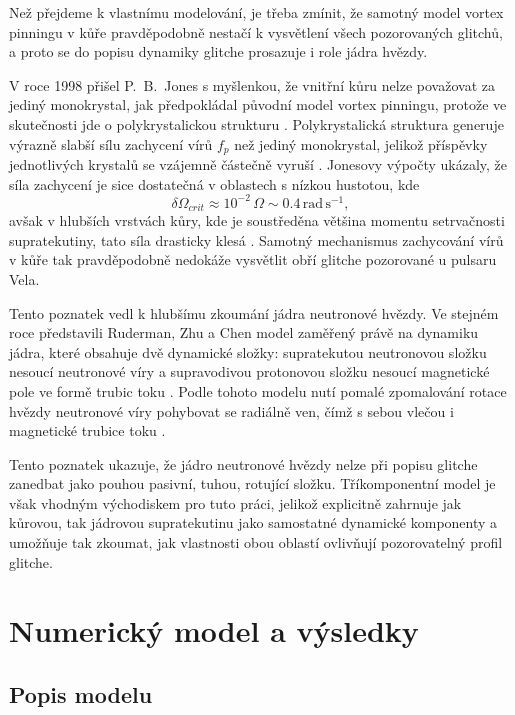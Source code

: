 \documentclass[%
final%
,htext%
]{ipothes}
\begin{document}
Než přejdeme k vlastnímu modelování, je třeba zmínit, že samotný model vortex pinningu v kůře pravděpodobně nestačí k vysvětlení všech pozorovaných glitchů, a proto se do popisu dynamiky glitche prosazuje i role jádra hvězdy.

V roce 1998 přišel P.~B.~Jones s myšlenkou, že vnitřní kůru nelze považovat za jediný monokrystal, jak předpokládal původní model vortex pinningu, protože ve skutečnosti jde o polykrystalickou strukturu \cite{jones1998}. Polykrystalická struktura generuje výrazně slabší sílu zachycení vírů $f_p$ než jediný monokrystal, jelikož příspěvky jednotlivých krystalů se vzájemně částečně vyruší \cite{jones1998}. Jonesovy výpočty ukázaly, že síla zachycení je sice dostatečná v oblastech s nízkou hustotou, kde
\begin{equation}
\delta\Omega_{crit} \approx 10^{-2}\,\Omega \sim 0.4\,\mathrm{rad\,s^{-1}},
\end{equation}
avšak v hlubších vrstvách kůry, kde je soustředěna většina momentu setrvačnosti supratekutiny, tato síla drasticky klesá \cite{jones1998}. Samotný mechanismus zachycování vírů v kůře tak pravděpodobně nedokáže vysvětlit obří glitche pozorované u pulsaru Vela.

Tento poznatek vedl k hlubšímu zkoumání jádra neutronové hvězdy. Ve stejném roce představili Ruderman, Zhu a Chen model zaměřený právě na dynamiku jádra, které obsahuje dvě dynamické složky: supratekutou neutronovou složku nesoucí neutronové víry a supravodivou protonovou složku nesoucí magnetické pole ve formě trubic toku \cite{ruderman1998}. Podle tohoto modelu nutí pomalé zpomalování rotace hvězdy neutronové víry pohybovat se radiálně ven, čímž s sebou vlečou i magnetické trubice toku \cite{ruderman1998}.

Tento poznatek ukazuje, že jádro neutronové hvězdy nelze při popisu glitche zanedbat jako pouhou pasivní, tuhou, rotující složku. Tříkomponentní model je však vhodným východiskem pro tuto práci, jelikož explicitně zahrnuje jak kůrovou, tak jádrovou supratekutinu jako samostatné dynamické komponenty a umožňuje tak zkoumat, jak vlastnosti obou oblastí ovlivňují pozorovatelný profil glitche.


\chapter{Numerický model a výsledky}

\section{Popis modelu}
\end{document}
